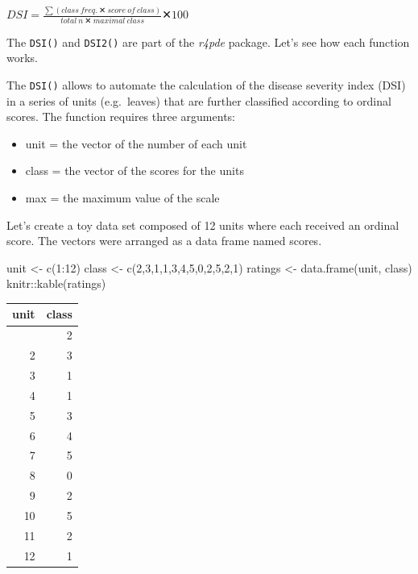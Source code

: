 \documentclass[
  letterpaper,
]{book}
\newenvironment{Shaded}{\begin{snugshade}}{\end{snugshade}}
\newcommand{\DecValTok}[1]{\textcolor[rgb]{0.68,0.00,0.00}{#1}}
\newcommand{\FunctionTok}[1]{\textcolor[rgb]{0.28,0.35,0.67}{#1}}
\newcommand{\NormalTok}[1]{\textcolor[rgb]{0.00,0.23,0.31}{#1}}
\newcommand{\OtherTok}[1]{\textcolor[rgb]{0.00,0.23,0.31}{#1}}
\newcommand{\SpecialCharTok}[1]{\textcolor[rgb]{0.37,0.37,0.37}{#1}}
\begin{document}
\(DSI = \frac{∑(class \ freq. \ ✕ \ score \  of \ class)} {total \ n \ ✕ \ maximal \ class} ✕ 100\)

The \texttt{DSI()} and \texttt{DSI2()} are part of the \emph{r4pde}
package. Let's see how each function works.

The \texttt{DSI()} allows to automate the calculation of the disease
severity index (DSI) in a series of units (e.g.~leaves) that are further
classified according to ordinal scores. The function requires three
arguments:

\begin{itemize}
\item
  unit = the vector of the number of each unit
\item
  class = the vector of the scores for the units
\item
  max = the maximum value of the scale
\end{itemize}

Let's create a toy data set composed of 12 units where each received an
ordinal score. The vectors were arranged as a data frame named scores.

\begin{Shaded}
\begin{Highlighting}[]
\NormalTok{unit }\OtherTok{\textless{}{-}} \FunctionTok{c}\NormalTok{(}\DecValTok{1}\SpecialCharTok{:}\DecValTok{12}\NormalTok{)}
\NormalTok{class }\OtherTok{\textless{}{-}} \FunctionTok{c}\NormalTok{(}\DecValTok{2}\NormalTok{,}\DecValTok{3}\NormalTok{,}\DecValTok{1}\NormalTok{,}\DecValTok{1}\NormalTok{,}\DecValTok{3}\NormalTok{,}\DecValTok{4}\NormalTok{,}\DecValTok{5}\NormalTok{,}\DecValTok{0}\NormalTok{,}\DecValTok{2}\NormalTok{,}\DecValTok{5}\NormalTok{,}\DecValTok{2}\NormalTok{,}\DecValTok{1}\NormalTok{)}
\NormalTok{ratings }\OtherTok{\textless{}{-}} \FunctionTok{data.frame}\NormalTok{(unit, class)}
\NormalTok{knitr}\SpecialCharTok{::}\FunctionTok{kable}\NormalTok{(ratings)}
\end{Highlighting}
\end{Shaded}

\begin{longtable}[]{@{}rr@{}}
\toprule\noalign{}
unit & class \\
\midrule\noalign{}
\endhead
\bottomrule\noalign{}
\endlastfoot
1 & 2 \\
2 & 3 \\
3 & 1 \\
4 & 1 \\
5 & 3 \\
6 & 4 \\
7 & 5 \\
8 & 0 \\
9 & 2 \\
10 & 5 \\
11 & 2 \\
12 & 1 \\
\end{longtable}
\end{document}
